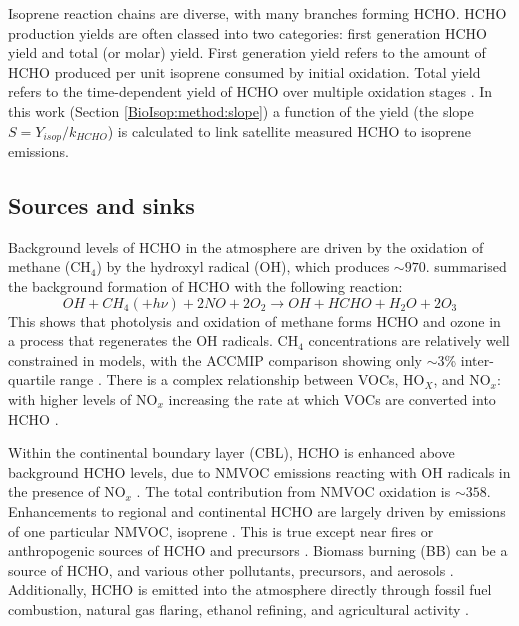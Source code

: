   Isoprene reaction chains are diverse, with many branches forming HCHO. 
  HCHO production yields are often classed into two categories: first generation HCHO yield and total (or molar) yield.
  First generation yield refers to the amount of HCHO produced per unit isoprene consumed by initial oxidation.
  Total yield refers to the time-dependent yield of HCHO over multiple oxidation stages \parencite{Wolfe2016}.
  In this work (Section \ref{BioIsop:method:slope}) a function of the yield (the slope $S = Y_{isop}/k_{HCHO}$) is calculated to link satellite measured HCHO to isoprene emissions.
  
  \subsection{Sources and sinks}
    \label{LR:HCHO:Sources}
     
    Background levels of HCHO in the atmosphere are driven by the oxidation of methane (CH$_4$) by the hydroxyl radical (OH$\dot{}$), which produces $\sim 970$\tgpyr \parencite{FortemsCheiney2012}.
    \textcite{Atkinson2000} summarised the background formation of HCHO with the following reaction:
    \begin{equation*} \label{LR:HCHO:Sources:eqn_MethaneBackground}
      OH + CH_4 (+ h\nu) + 2NO + 2O_2 \rightarrow OH + HCHO + H_2O + 2O_3
    \end{equation*}
    This shows that photolysis and oxidation of methane forms HCHO and ozone in a process that regenerates the OH radicals.
    CH$_4$ concentrations are relatively well constrained in models, with the ACCMIP comparison showing only $\sim3$\% inter-quartile range \parencite{Young2013}.
    There is a complex relationship between VOCs, HO$_X$, and NO$_x$: with higher levels of NO$_x$ increasing the rate at which VOCs are converted into HCHO \parencite{Wolfe2016}.
    
    Within the continental boundary layer (CBL), HCHO is enhanced above background HCHO levels, due to NMVOC emissions reacting with OH radicals in the presence of NO$_x$ \parencite{Wagner2002, Millet2006, Kefauver2014}.
    The total contribution from NMVOC oxidation is $\sim 358$\tgpyr \parencite{FortemsCheiney2012}.
    Enhancements to regional and continental HCHO are largely driven by emissions of one particular NMVOC, isoprene \parencite{Guenther1995,Palmer2003, Shim2005, Kefauver2014}.
    This is true except near fires or anthropogenic sources of HCHO and precursors \parencite{Guenther1995, Kefauver2014, Wolfe2016}.
    Biomass burning (BB) can be a source of HCHO, and various other pollutants, precursors, and aerosols \parencite{Guenther1995, Andreae2001}.
    Additionally, HCHO is emitted into the atmosphere directly through fossil fuel combustion, natural gas flaring, ethanol refining, and agricultural activity \parencite{Wolfe2016}.
    
